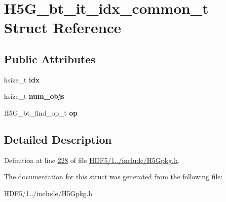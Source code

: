 \hypertarget{struct_h5_g__bt__it__idx__common__t}{}\section{H5\+G\+\_\+bt\+\_\+it\+\_\+idx\+\_\+common\+\_\+t Struct Reference}
\label{struct_h5_g__bt__it__idx__common__t}
\subsection*{Public Attributes}
\begin{DoxyCompactItemize}
\item 
\mbox{\label{struct_h5_g__bt__it__idx__common__t_a8a1848859825ec7e6d25e09aa67d9ffc}} 
hsize\+\_\+t {\bfseries idx}
\item 
\mbox{\label{struct_h5_g__bt__it__idx__common__t_ad0b4517a61aab759d672900423abd3d4}} 
hsize\+\_\+t {\bfseries num\+\_\+objs}
\item 
\mbox{\label{struct_h5_g__bt__it__idx__common__t_a6b6604eb6df365dc601a675028199e18}} 
H5\+G\+\_\+bt\+\_\+find\+\_\+op\+\_\+t {\bfseries op}
\end{DoxyCompactItemize}


\subsection{Detailed Description}


Definition at line \hyperlink{_h_d_f5_21_810_81_2include_2_h5_gpkg_8h_source_l00228}{228} of file \hyperlink{_h_d_f5_21_810_81_2include_2_h5_gpkg_8h_source}{H\+D\+F5/1../include/\+H5\+Gpkg.\+h}.



The documentation for this struct was generated from the following file\+:\begin{DoxyCompactItemize}
\item 
H\+D\+F5/1../include/\+H5\+Gpkg.\+h\end{DoxyCompactItemize}
